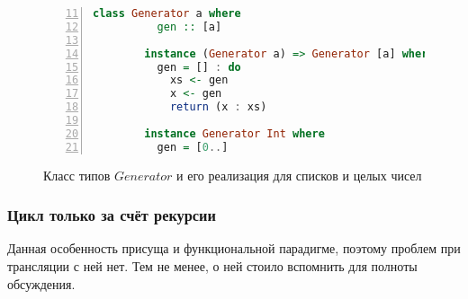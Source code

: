 \begin{figure}[h!]
  \begin{center}
  \begin{minipage}{0.7\textwidth}
  \begin{lstlisting}[language=Haskell, frame=single, numbers=left,numberstyle=\small, firstnumber=11, escapechar=|]
        class Generator a where
          gen :: [a]
        
        instance (Generator a) => Generator [a] where
          gen = [] : do
            xs <- gen
            x <- gen
            return (x : xs)
        
        instance Generator Int where
          gen = [0..]
    \end{lstlisting}
  \end{minipage}
  \end{center}
  \caption{Класс типов $Generator$ и его реализация для списков и целых чисел}
  \label{lst:generator}
\end{figure}


\subsubsection{Цикл только за счёт рекурсии}

Данная особенность присуща и функциональной парадигме, поэтому проблем при трансляции с ней нет.
Тем не менее, о ней стоило вспомнить для полноты обсуждения.

